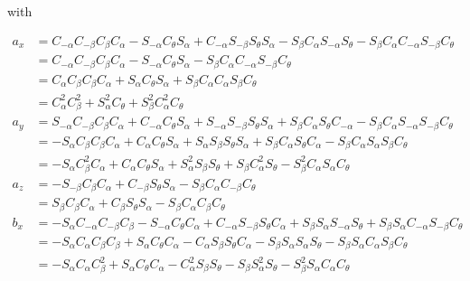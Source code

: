 \documentclass[a4paper,11pt]{article}
\begin{document}
\begin {enumerate}
		with

		\begin{align*}
			a_x &= C_{-\alpha}C_{-\beta}C_{\beta}C_{\alpha} - S_{-\alpha}C_{\theta}S_{\alpha} + C_{-\alpha}S_{-\beta}S_{\theta}S_{\alpha} - S_{\beta}C_{\alpha}S_{-\alpha}S_{\theta} - S_{\beta}C_{\alpha}C_{-\alpha}S_{-\beta}C_{\theta}\\
			&= C_{-\alpha}C_{-\beta}C_{\beta}C_{\alpha} - S_{-\alpha}C_{\theta}S_{\alpha} - S_{\beta}C_{\alpha}C_{-\alpha}S_{-\beta}C_{\theta}\\
			&= C_{\alpha}C_{\beta}C_{\beta}C_{\alpha} + S_{\alpha}C_{\theta}S_{\alpha} + S_{\beta}C_{\alpha}C_{\alpha}S_{\beta}C_{\theta}\\
			&= C_{\alpha}^2C_{\beta}^2 + S_{\alpha}^2C_{\theta} + S_{\beta}^2C_{\alpha}^2C_{\theta}\\
			a_y &= S_{-\alpha}C_{-\beta}C_{\beta}C_{\alpha} + C_{-\alpha}C_{\theta}S_{\alpha} + S_{-\alpha}S_{-\beta}S_{\theta}S_{\alpha} + S_{\beta}C_{\alpha}S_{\theta}C_{-\alpha} - S_{\beta}C_{\alpha}S_{-\alpha}S_{-\beta}C_{\theta}\\
			&= -S_{\alpha}C_{\beta}C_{\beta}C_{\alpha} + C_{\alpha}C_{\theta}S_{\alpha} + S_{\alpha}S_{\beta}S_{\theta}S_{\alpha} + S_{\beta}C_{\alpha}S_{\theta}C_{\alpha} - S_{\beta}C_{\alpha}S_{\alpha}S_{\beta}C_{\theta}\\
			&= -S_{\alpha}C_{\beta}^2C_{\alpha} + C_{\alpha}C_{\theta}S_{\alpha} + S_{\alpha}^2S_{\beta}S_{\theta} + S_{\beta}C_{\alpha}^2S_{\theta} - S_{\beta}^2C_{\alpha}S_{\alpha}C_{\theta}\\
			a_z &= -S_{-\beta}C_{\beta}C_{\alpha} + C_{-\beta}S_{\theta}S_{\alpha} - S_{\beta}C_{\alpha}C_{-\beta}C_{\theta}\\
			&= S_{\beta}C_{\beta}C_{\alpha} + C_{\beta}S_{\theta}S_{\alpha} - S_{\beta}C_{\alpha}C_{\beta}C_{\theta}\\
			b_x &= -S_{\alpha}C_{-\alpha}C_{-\beta}C_{\beta} - S_{-\alpha}C_{\theta}C_{\alpha} + C_{-\alpha}S_{-\beta}S_{\theta}C_{\alpha} + S_{\beta}S_{\alpha}S_{-\alpha}S_{\theta} + S_{\beta}S_{\alpha}C_{-\alpha}S_{-\beta}C_{\theta}\\
			&= -S_{\alpha}C_{\alpha}C_{\beta}C_{\beta} + S_{\alpha}C_{\theta}C_{\alpha} - C_{\alpha}S_{\beta}S_{\theta}C_{\alpha} - S_{\beta}S_{\alpha}S_{\alpha}S_{\theta} - S_{\beta}S_{\alpha}C_{\alpha}S_{\beta}C_{\theta}\\
			&= -S_{\alpha}C_{\alpha}C_{\beta}^2 + S_{\alpha}C_{\theta}C_{\alpha} - C_{\alpha}^2S_{\beta}S_{\theta} - S_{\beta}S_{\alpha}^2S_{\theta} - S_{\beta}^2S_{\alpha}C_{\alpha}C_{\theta}\\

\end{align*}
\end{enumerate}
\end{document}
